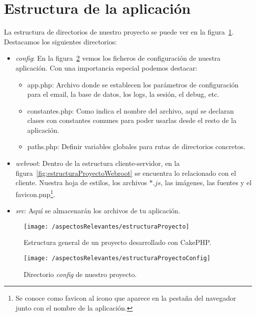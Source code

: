 \section{Estructura de la aplicación}

La estructura de directorios de nuestro proyecto se puede ver en la figura~\ref{fig:estructuraProyecto}. Destacamos los siguientes directorios:

\begin{itemize}
	\item \textit{config}: En la figura~\ref{fig:estructuraProyectoConfig} vemos los ficheros de configuración de nuestra aplicación. Con una importancia especial podemos destacar: 
	\begin{itemize}
		\item app.php: Archivo donde se establecen los parámetros de configuración para el email, la base de datos, los logs, la sesión, el debug, etc.
		\item constantes.php: Como indica el nombre del archivo, aquí se declaran clases con constantes comunes para poder usarlas desde el resto de la aplicación.
		\item paths.php: Definir variables globales para rutas de directorios concretos.
	\end{itemize}
		
	\item \textit{webroot}: Dentro de la estructura cliente-servidor, en la figura~\ref{fig:estructuraProyectoWebroot} se encuentra lo relacionado con el cliente. Nuestra hoja de estilos, los archivos $*.js$, las imágenes, las fuentes y el favicon.pnp\footnote{Se conoce como favicon al icono que aparece en la pestaña del navegador junto con el nombre de la aplicación.}.
	
	\item \textit{src}: Aquí se almacenarán los archivos de tu aplicación.
\end{itemize}

\begin{figure}[ht]
	\centering
	\texttt{[image: /aspectosRelevantes/estructuraProyecto]}
	\caption{Estructura general de un proyecto desarrollado con CakePHP.}
	\label{fig:estructuraProyecto}
\end{figure}

\begin{figure}[ht]
	\centering
	\texttt{[image: /aspectosRelevantes/estructuraProyectoConfig]}
	\caption{Directorio \textit{config} de nuestro proyecto.}
	\label{fig:estructuraProyectoConfig}
\end{figure}

